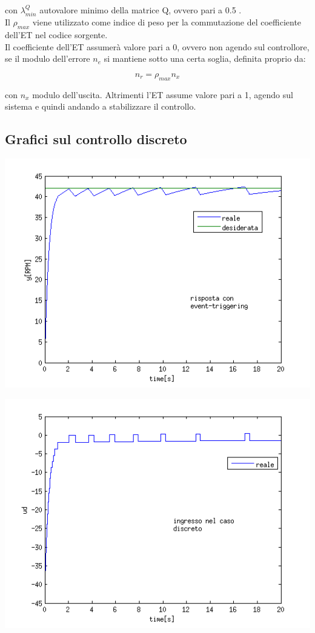\documentclass[a4paper,13pt]{article}
\begin{document}
	con $\lambda_{min}^{Q}$ autovalore minimo della matrice Q, ovvero pari a 0.5 .\\
	
	Il $\rho_{max}$ viene utilizzato come indice di peso per la commutazione del coefficiente dell'ET nel codice sorgente.
	\\ Il coefficiente dell'ET assumerà valore pari a 0, ovvero non agendo sul controllore, se il modulo dell'errore        	$n_{e}$ si mantiene sotto una certa soglia, definita proprio da:
	
\begin{equation*}
	n_{r}=\rho_{max}n_{x}
\end{equation*}

	con $n_{x}$ modulo dell'uscita.
	Altrimenti l'ET assume valore pari a 1, agendo sul sistema e quindi andando a stabilizzare il controllo.
	
\subsection{Grafici sul controllo discreto}

\begin{center}
\includegraphics[scale=0.6]{graph/ydisc.png}
\end{center}
\begin{center}
\includegraphics[scale=0.6]{graph/udisc.png}
\end{center}
\end{document}
